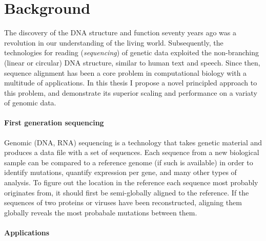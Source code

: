 \section*{Background}

The discovery of the DNA structure and function\citep{watson1953structure}
seventy years ago was a revolution in our understanding of the living world.
Subsequently, the technologies for reading (\emph{sequencing}) of genetic data
exploited the non-branching (linear or circular) DNA structure, similar to human
text and speech. Since then, sequence alignment has been a core problem in
computational biology with a multitude of applications. In this thesis I propose
a novel principled approach to this problem, and demonstrate its superior
scaling and performance on a variaty of genomic data.

\paragraph{First generation sequencing}
Genomic (DNA, RNA) sequencing is a technology that takes genetic material and
produces a data file with a set of sequences. Each sequence from a new
biological sample can be compared to a reference genome (if such is available)
in order to identify mutations, quantify expression per gene, and many other
types of analysis. To figure out the location in the reference each sequence
most probably originates from, it should first be semi-globally aligned to the
reference. If the sequences of two proteins or viruses have been reconstructed,
aligning them globally reveals the most probabale mutations between them.

\paragraph{Applications}

